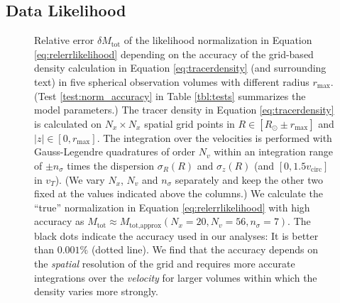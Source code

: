 \subsection{Data Likelihood} \label{sec:likelihood}



\begin{figure}[!htbp]
\centering
{}
\caption{Relative error  $\delta M_\text{tot}$ of the likelihood normalization in Equation \ref{eq:relerrlikelihood} depending on the accuracy of the grid-based density calculation in Equation \ref{eq:tracerdensity} (and surrounding text) in five spherical observation volumes with different radius $r_\text{max}$. (Test \ref{test:norm_accuracy} in Table \ref{tbl:tests} summarizes the model parameters.) The tracer density in Equation \ref{eq:tracerdensity} is calculated on $N_x\times N_x$ spatial grid points in $R \in [R_\odot \pm r_\text{max}]$ and $|z| \in [0,r_\text{max}]$. The integration over the velocities is performed with Gauss-Legendre quadratures of order $N_v$ within an integration range of $\pm n_\sigma$ times the dispersion $\sigma_R(R)$ and $\sigma_z(R)$ (and $[0,1.5v_\text{circ}]$ in $v_T$). (We vary $N_x$, $N_v$ and $n_\sigma$ separately and keep the other two fixed at the values indicated above the columns.) We calculate the ``true'' normalization in Equation \ref{eq:relerrlikelihood} with high accuracy as $M_\text{tot} \approx M_\text{tot,approx}(N_x=20,N_v=56,n_\sigma=7)$. The black dots indicate the accuracy used in our analyses: It is better than $0.001\%$ (dotted line). We find that the accuracy depends on the \emph{spatial} resolution of the grid and requires more accurate integrations over the \emph{velocity} for larger volumes within which the density varies more strongly.}
\label{fig:norm_accuracy}
\end{figure}


